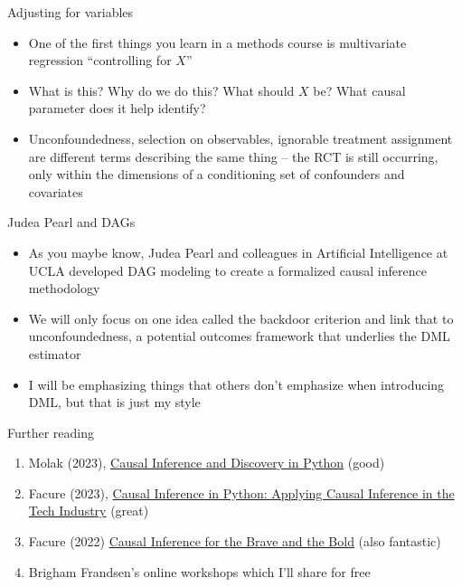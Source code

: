 \documentclass{beamer}
\begin{document}
\begin{frame}{Adjusting for variables}

\begin{itemize}
\item One of the first things you learn in a methods course is multivariate regression ``controlling for $X$''
\item What is this? Why do we do this?  What should $X$ be? What causal parameter does it help identify?
\item Unconfoundedness, selection on observables, ignorable treatment assignment are different terms describing the same thing -- the RCT is still occurring, only within the dimensions of a conditioning set of confounders and covariates
\end{itemize}

\end{frame}



\begin{frame}{Judea Pearl and DAGs}


  \begin{itemize}
    \item As you maybe know, Judea Pearl and colleagues in Artificial Intelligence at UCLA developed DAG modeling to create a formalized causal inference methodology
    \item We will only focus on one idea called the backdoor criterion and link that to unconfoundedness, a potential outcomes framework that underlies the DML estimator
    \item I will be emphasizing things that others don't emphasize when introducing DML, but that is just my style
  \end{itemize}

\end{frame}


\begin{frame}{Further reading}

  \begin{enumerate}

	\item Molak (2023), \underline{Causal Inference and Discovery in Python} (good)
	\item Facure (2023), \underline{Causal Inference in Python: Applying Causal Inference in the Tech Industry} (great)
	\item Facure (2022) \underline{Causal Inference for the Brave and the Bold} (also fantastic)
	\item Brigham Frandsen's online workshops which I'll share for free
	
  \end{enumerate}

\end{frame}
\end{document}
